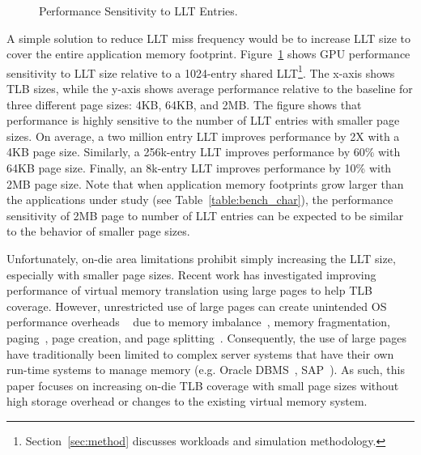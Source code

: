 \begin{figure}[t] 
\vspace{0. in}
\centering
\centerline{}

	\caption{\small Performance Sensitivity to LLT Entries. \normalsize}

\label{fig:tlb_sensitivity} 
\vspace{-0.15 in}
\end{figure}

A simple solution to reduce LLT miss frequency would be to increase
LLT size to cover the entire application memory footprint.
Figure~\ref{fig:tlb_sensitivity} shows GPU performance sensitivity to
LLT size relative to a 1024-entry shared
LLT\footnote{Section~\ref{sec:method} discusses workloads and
simulation methodology.}. The x-axis shows TLB sizes, while the y-axis
shows average performance relative to the baseline for three different
page sizes: 4KB, 64KB, and 2MB. The figure shows that performance is
highly sensitive to the number of LLT entries with smaller page sizes.
On average, a two million entry LLT improves performance by 2X with a
4KB page size. Similarly, a 256k-entry LLT improves performance by
60\% with 64KB page size. Finally, an 8k-entry LLT improves
performance by 10\% with 2MB page size. Note that when application
memory footprints grow larger than the applications under study (see
Table~\ref{table:bench_char}), the performance sensitivity of 2MB page
to number of LLT entries can be expected to be similar to the behavior
of smaller page sizes.


Unfortunately, on-die area limitations prohibit simply increasing the
LLT size, especially with smaller page sizes. Recent work has
investigated improving performance of virtual memory translation using
large pages to help TLB coverage. However, unrestricted use of large
pages can create unintended OS performance overheads
~\cite{SuperPageProblem, TwoPageSize} due to memory
imbalance~\cite{numa-harmful}, memory fragmentation,
paging~\cite{cameo}, page creation, and page
splitting~\cite{largepagevm}. Consequently, the use of large pages
have traditionally been limited to complex server systems that have
their own run-time systems to manage memory (e.g. Oracle
DBMS~\cite{oracle_dbms}, SAP~\cite{sap}). As such, this paper focuses
on increasing on-die TLB coverage with small page sizes without high
storage overhead or changes to the existing virtual memory system.

